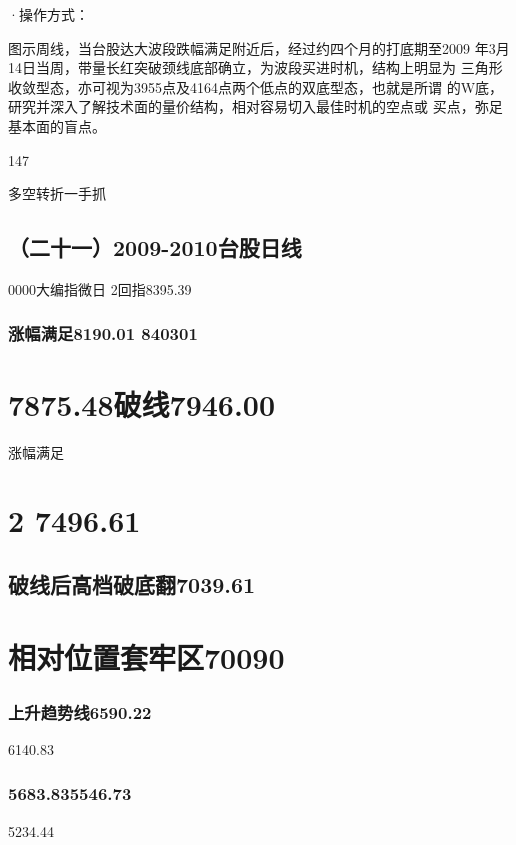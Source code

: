 \documentclass{article}
\begin{document}
·操作方式：

图示周线，当台股达大波段跌幅满足附近后，经过约四个月的打底期至2009 年3月14日当周，带量长红突破颈线底部确立，为波段买进时机，结构上明显为 三角形收敛型态，亦可视为3955点及4164点两个低点的双底型态，也就是所谓 的W底，研究并深入了解技术面的量价结构，相对容易切入最佳时机的空点或 买点，弥足基本面的盲点。

147

\clearpage

多空转折一手抓

\subsection{（二十一）2009-2010台股日线}

0000大编指微日 2回指8395.39

\subsubsection{涨幅满足8190.01 840301}

\section{7875.48破线7946.00}

涨幅满足

\section{2 7496.61}

\subsection{破线后高档破底翻7039.61}

\section{相对位置套牢区70090}

\subsubsection{上升趋势线6590.22}

6140.83

\subsubsection{5683.835546.73}

5234.44
\end{document}
